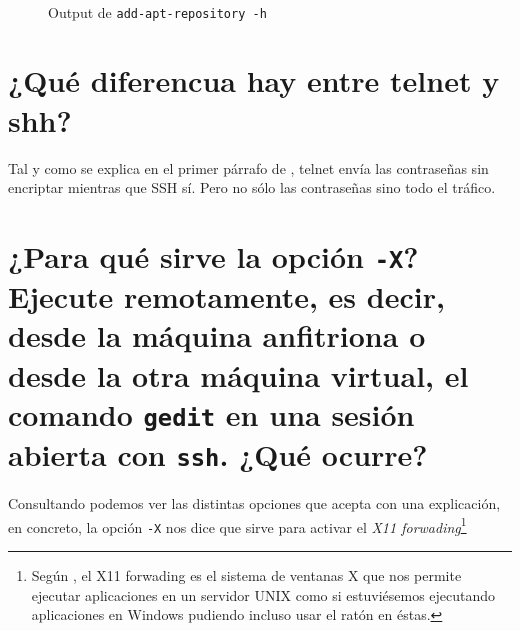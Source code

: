 \documentclass[10pt,a4paper,spanish]{article}
\numberwithin{equation}{section} %
\numberwithin{figure}{section} %
\numberwithin{table}{section} %
\begin{document}
\begin{figure}[!h]
\centering
\mbox {
\qquad
{}
}
\caption{Output de \texttt{add-apt-repository -h}}
\label{addrepository}
\end{figure}

\section{¿Qué diferencua hay entre telnet y shh?}
Tal y como se explica en el primer párrafo de \cite{openssh}, telnet envía las contraseñas sin encriptar mientras que SSH sí. Pero no sólo las contraseñas sino todo el tráfico. 

\section{¿Para qué sirve la opción \texttt{-X}? Ejecute remotamente, es decir, desde la máquina anfitriona o desde la otra máquina virtual, el comando \texttt{gedit} en una sesión abierta con \texttt{ssh}. ¿Qué ocurre?}

Consultando \cite{manssh} podemos ver las distintas opciones que acepta con una explicación, en concreto, la opción \texttt{-X} nos dice que sirve para activar el \textit{X11 forwading}\footnote{Según \cite{x11}, el X11 forwading es el sistema de ventanas X que nos permite ejecutar aplicaciones en un servidor UNIX como si estuviésemos ejecutando aplicaciones en Windows pudiendo incluso usar el ratón en éstas.}
\end{document}
